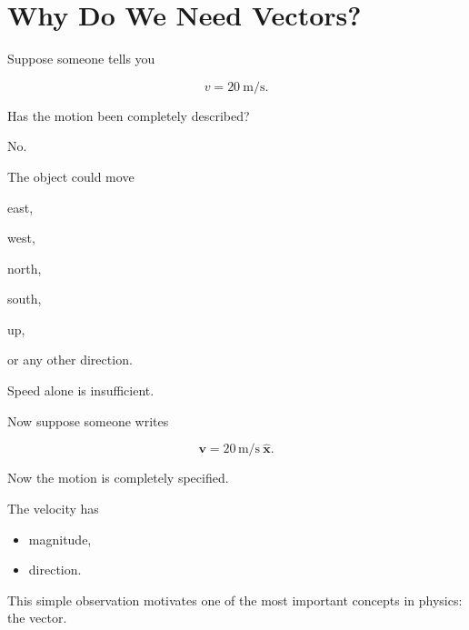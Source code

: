 \section{Why Do We Need Vectors?}

Suppose someone tells you

\[
v=20\ \mathrm{m/s}.
\]

Has the motion been completely described?

No.

The object could move

east,

west,

north,

south,

up,

or any other direction.

Speed alone is insufficient.

Now suppose someone writes

\[
\mathbf v=
20\,\mathrm{m/s}
\ \hat{\mathbf x}.
\]

Now the motion is completely specified.

The velocity has

\begin{itemize}
	\item magnitude,
	\item direction.
\end{itemize}

This simple observation motivates one of the most important concepts in
physics: the vector.

